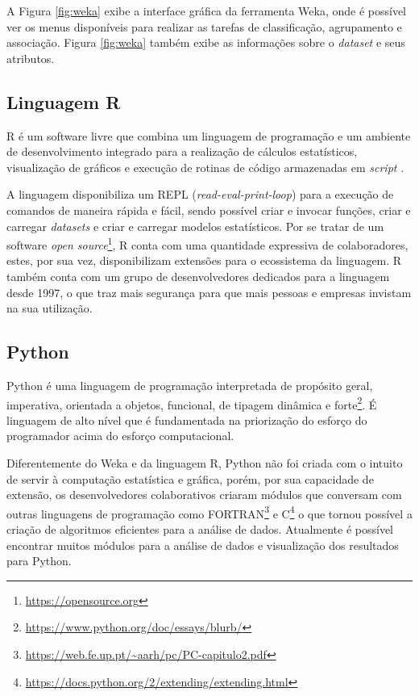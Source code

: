 A Figura \ref{fig:weka} exibe a interface gráfica da ferramenta Weka, onde é possível ver os menus disponíveis para realizar as tarefas de classificação,  agrupamento e associação. Figura \ref{fig:weka} também exibe as informações sobre o \textit{dataset} e seus atributos.

\subsection{Linguagem R}
R é um software livre que combina um linguagem de programação e um ambiente de desenvolvimento integrado para a realização de cálculos estatísticos, visualização de gráficos e execução de rotinas de código armazenadas em \textit{script} \cite{Team2018}.

A linguagem disponibiliza um REPL (\textit{read-eval-print-loop}) para a execução de comandos de maneira rápida e fácil, sendo possível criar e invocar funções, criar e carregar \textit{datasets} e criar e carregar modelos estatísticos. Por se tratar de um software \textit{open source}\footnote{\url{https://opensource.org}}, R conta com uma quantidade expressiva de colaboradores, estes, por sua vez, disponibilizam extensões para o ecossistema da linguagem. R também conta com um grupo de desenvolvedores dedicados para a linguagem desde 1997, o que traz mais segurança para que mais pessoas e empresas invistam na sua utilização.


\subsection{Python}

Python é uma linguagem de programação interpretada de propósito geral, imperativa, orientada a objetos, funcional, de tipagem dinâmica e forte\footnote{\url{https://www.python.org/doc/essays/blurb/}}. É  linguagem de alto nível que é fundamentada na priorização do esforço do programador acima do esforço computacional.

Diferentemente do Weka e da linguagem R, Python não foi criada com o intuito de servir à computação estatística e gráfica, porém, por sua capacidade de extensão, os desenvolvedores colaborativos criaram módulos que conversam com outras linguagens de programação como FORTRAN\footnote{\url{https://web.fe.up.pt/~aarh/pc/PC-capitulo2.pdf}} e C\footnote{\url{https://docs.python.org/2/extending/extending.html}} o que tornou possível a criação de algoritmos eficientes para a análise de dados. Atualmente é possível encontrar muitos módulos para a análise de dados e visualização dos resultados para Python.

